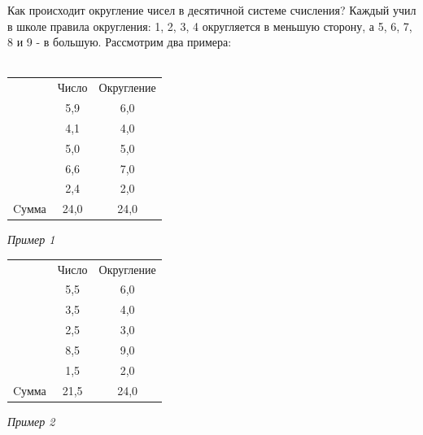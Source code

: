 Как происходит округление чисел в десятичной системе счисления? Каждый учил в школе правила округления: 1, 2, 3, 4 округляется в меньшую сторону, а 5, 6, 7, 8 и 9 - в большую.
Рассмотрим два примера:
\\
\\
\begin{minipage}[c]{6cm}
\begin{center}
\begin{tabular}{|c|c|c|}
\hline  & Число & Округление
\\\hhline{~--} & 5,9 & 6,0
\\ & 4,1 & 4,0
\\ & 5,0 & 5,0
\\ & 6,6 & 7,0
\\ & 2,4 & 2,0
\\\hline Cумма & 24,0 & 24,0
\\\hline
\end{tabular}
\emph{Пример 1}
\newline
\end{center}
\end{minipage}
\begin{minipage}[c]{6cm}
\begin{center}
\begin{tabular}{|c|c|c|}
\hline & Число & Округление
\\\hhline{~--}  & 5,5 & 6,0
\\ & 3,5 & 4,0
\\ & 2,5 & 3,0
\\ & 8,5 & 9,0
\\ & 1,5 & 2,0
\\\hline Cумма & 21,5 & 24,0
\\\hline
\end{tabular}
\emph{Пример 2}
\newline
\end{center}
\end{minipage}


